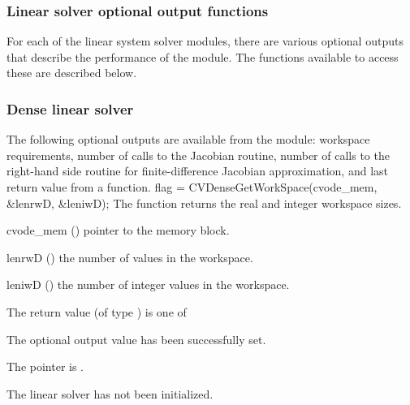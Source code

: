 
\subsubsection*{Linear solver optional output functions}\label{sss:optout_linsol}

For each of the linear system solver modules, there are various optional 
outputs that describe the performance of the module. The functions available 
to access these are described below.

\subsubsection{Dense linear solver}\label{sss:optout_dense}
The following optional outputs are available from the {\cvdense} module:
workspace requirements, number of calls to the Jacobian routine, number of 
calls to the right-hand side routine for finite-difference Jacobian approximation,
and last return value from a {\cvdense} function.
{
  flag = CVDenseGetWorkSpace(cvode\_mem, \&lenrwD, \&leniwD);
}
{
  The function  returns the
  {\cvdense} real and integer workspace sizes.
}
{
  \begin{args}
  \item[cvode\_mem] ()
    pointer to the {\cvode} memory block.
  \item[lenrwD] ()
    the number of  values in the {\cvdense} workspace.
  \item[leniwD] ()
    the number of integer values in the {\cvdense} workspace.
  \end{args}
}
{
  The return value  (of type ) is one of
  \begin{args}
  \item[\Id{CVDENSE\_SUCCESS}] 
    The optional output value has been successfully set.
  \item[\Id{CVDENSE\_MEM\_NULL}]
    The  pointer is .
  \item[\Id{CVDENSE\_LMEM\_NULL}]
    The {\cvdense} linear solver has not been initialized.
  \end{args}
}
